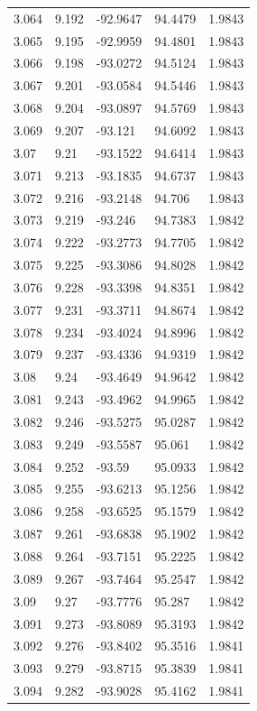 \begin{tabular}{lllll}
3.064 & 9.192 & -92.9647 & 94.4479 & 1.9843 \\
3.065 & 9.195 & -92.9959 & 94.4801 & 1.9843 \\
3.066 & 9.198 & -93.0272 & 94.5124 & 1.9843 \\
3.067 & 9.201 & -93.0584 & 94.5446 & 1.9843 \\
3.068 & 9.204 & -93.0897 & 94.5769 & 1.9843 \\
3.069 & 9.207 & -93.121 & 94.6092 & 1.9843 \\
3.07 & 9.21 & -93.1522 & 94.6414 & 1.9843 \\
3.071 & 9.213 & -93.1835 & 94.6737 & 1.9843 \\
3.072 & 9.216 & -93.2148 & 94.706 & 1.9843 \\
3.073 & 9.219 & -93.246 & 94.7383 & 1.9842 \\
3.074 & 9.222 & -93.2773 & 94.7705 & 1.9842 \\
3.075 & 9.225 & -93.3086 & 94.8028 & 1.9842 \\
3.076 & 9.228 & -93.3398 & 94.8351 & 1.9842 \\
3.077 & 9.231 & -93.3711 & 94.8674 & 1.9842 \\
3.078 & 9.234 & -93.4024 & 94.8996 & 1.9842 \\
3.079 & 9.237 & -93.4336 & 94.9319 & 1.9842 \\
3.08 & 9.24 & -93.4649 & 94.9642 & 1.9842 \\
3.081 & 9.243 & -93.4962 & 94.9965 & 1.9842 \\
3.082 & 9.246 & -93.5275 & 95.0287 & 1.9842 \\
3.083 & 9.249 & -93.5587 & 95.061 & 1.9842 \\
3.084 & 9.252 & -93.59 & 95.0933 & 1.9842 \\
3.085 & 9.255 & -93.6213 & 95.1256 & 1.9842 \\
3.086 & 9.258 & -93.6525 & 95.1579 & 1.9842 \\
3.087 & 9.261 & -93.6838 & 95.1902 & 1.9842 \\
3.088 & 9.264 & -93.7151 & 95.2225 & 1.9842 \\
3.089 & 9.267 & -93.7464 & 95.2547 & 1.9842 \\
3.09 & 9.27 & -93.7776 & 95.287 & 1.9842 \\
3.091 & 9.273 & -93.8089 & 95.3193 & 1.9842 \\
3.092 & 9.276 & -93.8402 & 95.3516 & 1.9841 \\
3.093 & 9.279 & -93.8715 & 95.3839 & 1.9841 \\
3.094 & 9.282 & -93.9028 & 95.4162 & 1.9841 \\

\end{tabular}

